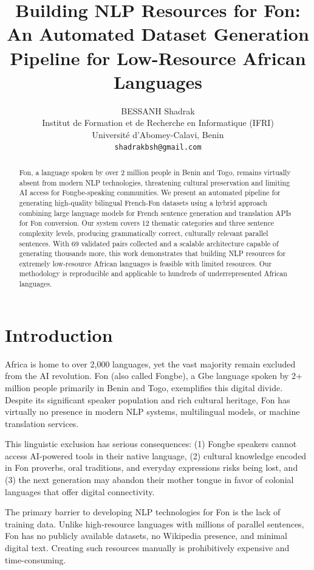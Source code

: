 \documentclass[10pt,twocolumn]{article}
\title{\textbf{Building NLP Resources for Fon: An Automated Dataset Generation Pipeline for Low-Resource African Languages}}
\author{
BESSANH Shadrak \\
Institut de Formation et de Recherche en Informatique (IFRI) \\
Université d'Abomey-Calavi, Benin \\
\texttt{shadrakbsh@gmail.com}
}
\date{}
\begin{document}
\maketitle

\begin{abstract}
Fon, a language spoken by over 2 million people in Benin and Togo, remains virtually absent from modern NLP technologies, threatening cultural preservation and limiting AI access for Fongbe-speaking communities. We present an automated pipeline for generating high-quality bilingual French-Fon datasets using a hybrid approach combining large language models for French sentence generation and translation APIs for Fon conversion. Our system covers 12 thematic categories and three sentence complexity levels, producing grammatically correct, culturally relevant parallel sentences. With 69 validated pairs collected and a scalable architecture capable of generating thousands more, this work demonstrates that building NLP resources for extremely low-resource African languages is feasible with limited resources. Our methodology is reproducible and applicable to hundreds of underrepresented African languages.
\end{abstract}

\section{Introduction}

Africa is home to over 2,000 languages, yet the vast majority remain excluded from the AI revolution. Fon (also called Fongbe), a Gbe language spoken by 2+ million people primarily in Benin and Togo, exemplifies this digital divide. Despite its significant speaker population and rich cultural heritage, Fon has virtually no presence in modern NLP systems, multilingual models, or machine translation services.

This linguistic exclusion has serious consequences: (1) Fongbe speakers cannot access AI-powered tools in their native language, (2) cultural knowledge encoded in Fon proverbs, oral traditions, and everyday expressions risks being lost, and (3) the next generation may abandon their mother tongue in favor of colonial languages that offer digital connectivity.

The primary barrier to developing NLP technologies for Fon is the lack of training data. Unlike high-resource languages with millions of parallel sentences, Fon has no publicly available datasets, no Wikipedia presence, and minimal digital text. Creating such resources manually is prohibitively expensive and time-consuming.
\end{document}
